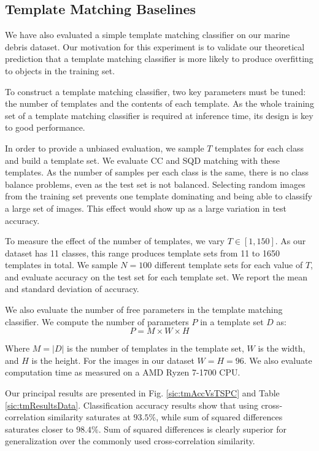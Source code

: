 \subsection{Template Matching Baselines}

We have also evaluated a simple template matching classifier on our marine debris dataset. Our motivation for this experiment is to validate our theoretical prediction that a template matching classifier is more likely to produce overfitting to objects in the training set.

To construct a template matching classifier, two key parameters must be tuned: the number of templates and the contents of each template. As the whole training set of a template matching classifier is required at inference time, its design is key to good performance.

In order to provide a unbiased evaluation, we sample $T$ templates for each class and build a template set. We evaluate CC and SQD matching with these templates. As the number of samples per each class is the same, there is no class balance problems, even as the test set is not balanced. Selecting random images from the training set prevents one template dominating and being able to classify a large set of images. This effect would show up as a large variation in test accuracy.

To measure the effect of the number of templates, we vary $T \in [1, 150]$. As our dataset has 11 classes, this range produces template sets from 11 to 1650 templates in total. We sample $N = 100$ different template sets for each value of $T$, and evaluate accuracy on the test set for each template set. We report the mean and standard deviation of accuracy.

We also evaluate the number of free parameters in the template matching classifier. We compute the number of parameters $P$ in a template set $D$ as:
\vspace*{1em}
\begin{equation}
	P = M \times W \times H
\end{equation}

Where $M = |D|$ is the number of templates in the template set, $W$ is the width, and $H$ is the height. For the images in our dataset $W = H = 96$. We also evaluate computation time as measured on a AMD Ryzen 7-1700 CPU.

Our principal results are presented in Fig. \ref{sic:tmAccVsTSPC} and Table \ref{sic:tmResultsData}. Classification accuracy results show that using cross-correlation similarity saturates at $93.5 \%$, while sum of squared differences saturates closer to $98.4 \%$. Sum of squared differences is clearly superior for generalization over the commonly used cross-correlation similarity.

